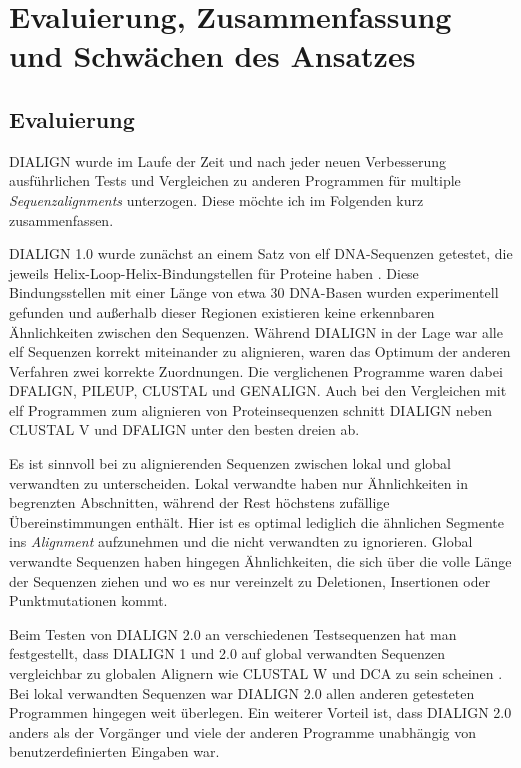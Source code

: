 \section{Evaluierung, Zusammenfassung und Schwächen des Ansatzes}

\subsection{Evaluierung}

DIALIGN	wurde im Laufe der Zeit und nach jeder neuen Verbesserung ausführlichen Tests und Vergleichen zu anderen Programmen für multiple \emph{Sequenzalignments} unterzogen. Diese möchte ich im Folgenden kurz zusammenfassen.

DIALIGN 1.0 wurde zunächst an einem Satz von elf DNA-Sequenzen getestet, die jeweils Helix-Loop-Helix-Bindungstellen für Proteine haben \citep{mdw96}. Diese Bindungsstellen mit einer Länge von etwa 30 DNA-Basen wurden experimentell gefunden und außerhalb dieser Regionen existieren keine erkennbaren Ähnlichkeiten zwischen den Sequenzen. Während DIALIGN in der Lage war alle elf Sequenzen korrekt miteinander zu alignieren, waren das Optimum der anderen Verfahren zwei korrekte Zuordnungen. Die verglichenen Programme waren dabei DFALIGN, PILEUP, CLUSTAL und GENALIGN. Auch bei den Vergleichen mit elf Programmen zum alignieren von Proteinsequenzen schnitt DIALIGN neben CLUSTAL V und DFALIGN unter den besten dreien ab.

Es ist sinnvoll bei zu alignierenden Sequenzen zwischen lokal und global verwandten zu unterscheiden. Lokal verwandte haben nur Ähnlichkeiten in begrenzten Abschnitten, während der Rest höchstens zufällige Übereinstimmungen enthält. Hier ist es optimal lediglich die ähnlichen Segmente ins \emph{Alignment} aufzunehmen und die nicht verwandten zu ignorieren. Global verwandte Sequenzen haben hingegen Ähnlichkeiten, die sich über die volle Länge der Sequenzen ziehen und wo es nur vereinzelt zu Deletionen, Insertionen oder Punktmutationen kommt.

Beim Testen von DIALIGN 2.0 an verschiedenen Testsequenzen hat man festgestellt, dass DIALIGN 1 und 2.0 auf global verwandten Sequenzen vergleichbar zu globalen Alignern wie CLUSTAL W und DCA zu sein scheinen \citep{mahd98}. Bei lokal verwandten Sequenzen war DIALIGN 2.0 allen anderen getesteten Programmen hingegen weit überlegen. Ein weiterer Vorteil ist, dass DIALIGN 2.0 anders als der Vorgänger und viele der anderen Programme unabhängig von benutzerdefinierten Eingaben war.

